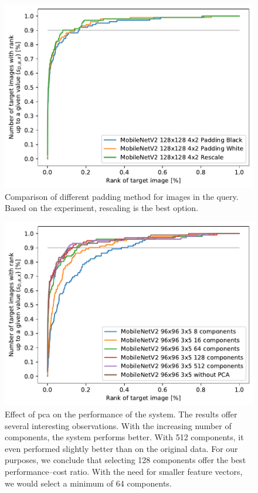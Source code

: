 \begin{figure}
    \centering
    \includegraphics[width=0.8\linewidth]{graphs/bf57efafbbbc7b5a1744054d87d4ecfa381c9eaf2459186904190d97bcb99a81.pdf}
    \caption[Comparison of different padding method for images in the query]{Comparison of different padding method for images in the query. Based on the experiment, rescaling is the best option.}
    \label{fig:padding}
\end{figure}

\begin{figure}
    \centering
    \includegraphics[width=0.8\linewidth]{graphs/6fbd4f70810e1f63f400ef601c1cdba0fd1635749810aa2347a4ff26e6fccf47.pdf}
    \caption[Effect of \acrshort{pca} on the performance of the system]{Effect of \acrshort{pca} on the performance of the system. The results offer several interesting observations. With the increasing number of components, the system performs better. With 512 components, it even performed slightly better than on the original data. For our purposes, we conclude that selecting 128 components offer the best performance--cost ratio. With the need for smaller feature vectors, we would select a minimum of 64 components.}
    \label{fig:pca}
\end{figure}

